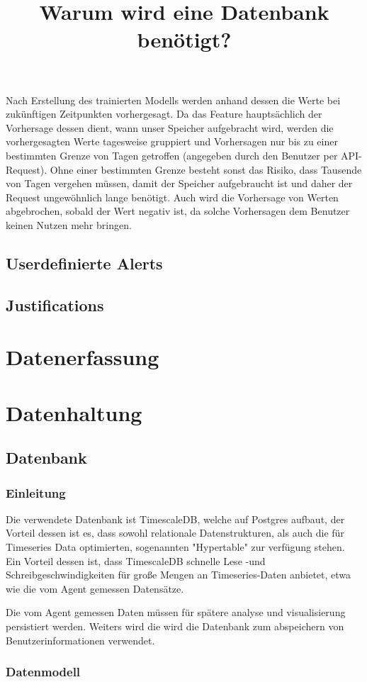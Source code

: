 \documentclass{report}
\begin{document}
Nach Erstellung des trainierten Modells werden anhand dessen die Werte bei zukünftigen Zeitpunkten vorhergesagt. Da das Feature hauptsächlich der Vorhersage dessen dient, wann unser Speicher aufgebracht wird, werden die vorhergesagten Werte tagesweise gruppiert und Vorhersagen nur bis zu einer bestimmten Grenze von Tagen getroffen (angegeben durch den Benutzer per API-Request).
Ohne einer bestimmten Grenze besteht sonst das Risiko, dass Tausende von Tagen vergehen müssen, damit der Speicher aufgebraucht ist und daher der Request ungewöhnlich lange benötigt. Auch wird die Vorhersage von Werten abgebrochen, sobald der Wert negativ ist, da solche Vorhersagen dem Benutzer keinen Nutzen mehr bringen.
\subsection{Userdefinierte Alerts}
\subsection{Justifications}
\section{Datenerfassung}
\section{Datenhaltung}
\subsection{Datenbank}
\subsubsection{Einleitung}
Die verwendete Datenbank ist TimescaleDB, welche auf Postgres aufbaut, der Vorteil dessen ist es, dass sowohl relationale Datenstrukturen, als auch die für Timeseries Data optimierten, sogenannten "Hypertable" zur verfügung stehen. Ein Vorteil dessen ist, dass TimescaleDB schnelle Lese -und Schreibgeschwindigkeiten für große Mengen an Timeseries-Daten anbietet, etwa wie die vom Agent gemessen Datensätze.

\title{Warum wird eine Datenbank benötigt?}
Die vom Agent gemessen Daten müssen für spätere analyse und visualisierung persistiert werden. Weiters wird die wird die Datenbank zum abspeichern von Benutzerinformationen verwendet.

\subsubsection{Datenmodell}
\end{document}
